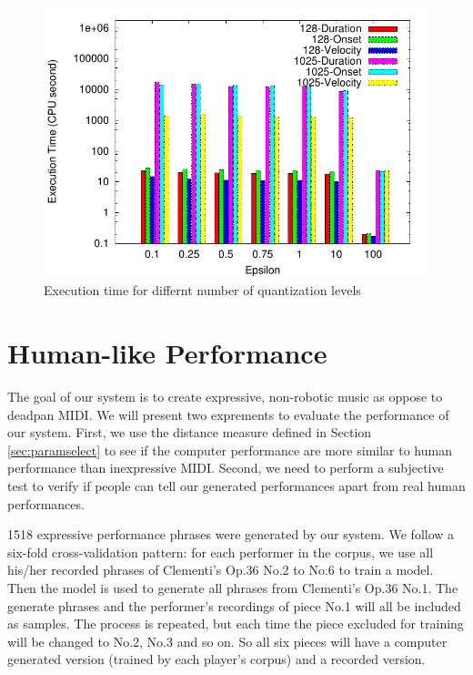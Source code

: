 \begin{figure}[tp]
   \begin{center}
      \includegraphics[width=\textwidth]{fig/quant_comp}
   \end{center}
   \caption{Execution time for differnt number of quantization levels}
   \label{fig:quant_comp}
\end{figure}

\section{Human-like Performance}
\label{sec:turing}
The goal of our system is to create expressive, non-robotic music as oppose to deadpan MIDI. We will present two exprements to evaluate the performance of our system. First, we use the distance measure defined in Section \ref{sec:paramselect} to see if the computer performance are more similar to human performance than inexpressive MIDI. Second, we need to perform a subjective test to verify if people can tell our generated performances apart from real human performances.

1518 expressive performance phrases were generated by our system. We follow a six-fold cross-validation pattern: for each performer in the corpus, we use all his/her recorded phrases of Clementi's Op.36 No.2 to No.6 to train a model. Then the model is used to generate all phrases from Clementi's Op.36 No.1. The generate phrases and the performer's recordings of piece No.1 will all be included as samples. The process is repeated, but each time the piece excluded for training will be changed to No.2, No.3 and so on. So all six pieces will have a computer generated version (trained by each player's corpus) and a recorded version.

